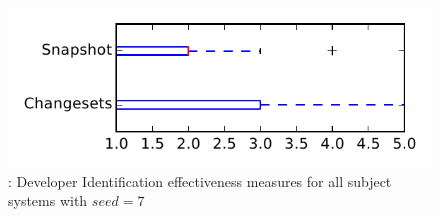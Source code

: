 
\begin{figure}
\centering
\includegraphics[height=0.4\textheight]{figures/dit_seed/rq1_tiny_7}
\caption{\rtwo: Developer Identification effectiveness measures for all subject systems with $seed=7$}
\label{fig:dit_seed:rq1:tiny}
\end{figure}
